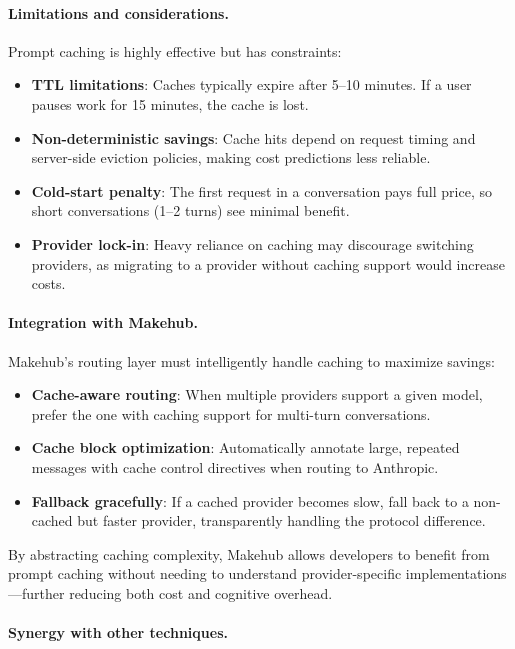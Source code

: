 \documentclass[english]{article}
\begin{document}
\paragraph{Limitations and considerations.}

Prompt caching is highly effective but has constraints:
\begin{itemize}
    \item \textbf{TTL limitations}: Caches typically expire after 5--10 minutes. If a user pauses work for 15 minutes, the cache is lost.
    \item \textbf{Non-deterministic savings}: Cache hits depend on request timing and server-side eviction policies, making cost predictions less reliable.
    \item \textbf{Cold-start penalty}: The first request in a conversation pays full price, so short conversations (1--2 turns) see minimal benefit.
    \item \textbf{Provider lock-in}: Heavy reliance on caching may discourage switching providers, as migrating to a provider without caching support would increase costs.
\end{itemize}

\paragraph{Integration with Makehub.}

Makehub's routing layer must intelligently handle caching to maximize savings:
\begin{itemize}
    \item \textbf{Cache-aware routing}: When multiple providers support a given model, prefer the one with caching support for multi-turn conversations.
    \item \textbf{Cache block optimization}: Automatically annotate large, repeated messages with cache control directives when routing to Anthropic.
    \item \textbf{Fallback gracefully}: If a cached provider becomes slow, fall back to a non-cached but faster provider, transparently handling the protocol difference.
\end{itemize}

By abstracting caching complexity, Makehub allows developers to benefit from prompt caching without needing to understand provider-specific implementations—further reducing both cost and cognitive overhead.

\paragraph{Synergy with other techniques.}
\end{document}
